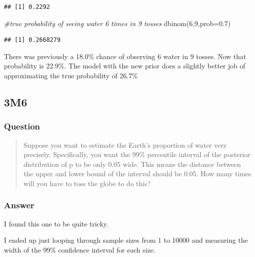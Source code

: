 \documentclass[
]{book}
\newenvironment{Shaded}{\begin{snugshade}}{\end{snugshade}}
\newcommand{\AttributeTok}[1]{\textcolor[rgb]{0.77,0.63,0.00}{#1}}
\newcommand{\CommentTok}[1]{\textcolor[rgb]{0.56,0.35,0.01}{\textit{#1}}}
\newcommand{\DecValTok}[1]{\textcolor[rgb]{0.00,0.00,0.81}{#1}}
\newcommand{\FloatTok}[1]{\textcolor[rgb]{0.00,0.00,0.81}{#1}}
\newcommand{\FunctionTok}[1]{\textcolor[rgb]{0.00,0.00,0.00}{#1}}
\newcommand{\NormalTok}[1]{#1}
\begin{document}
\begin{verbatim}
## [1] 0.2292
\end{verbatim}

\begin{Shaded}
\begin{Highlighting}[]
\CommentTok{\#true probability of seeing water 6 times in 9 tosses}
\FunctionTok{dbinom}\NormalTok{(}\DecValTok{6}\NormalTok{,}\DecValTok{9}\NormalTok{,}\AttributeTok{prob=}\FloatTok{0.7}\NormalTok{)}
\end{Highlighting}
\end{Shaded}

\begin{verbatim}
## [1] 0.2668279
\end{verbatim}

There was previously a 18.0\% chance of observing 6 water in 9 tosses. Now that probability is 22.9\%. The model with the new prior does a slightly better job of approximating the true probability of 26.7\%

\hypertarget{m6-1}{%
\subsection*{3M6}\label{m6-1}}

\hypertarget{question-27}{%
\subsubsection*{Question}\label{question-27}}

\begin{quote}
Suppose you want to estimate the Earth's proportion of water very precisely. Specifically, you want the 99\% percentile interval of the posterior distribution of p to be only 0.05 wide. This means the distance between the upper and lower bound of the interval should be 0.05. How many times will you have to toss the globe to do this?
\end{quote}

\hypertarget{answer-27}{%
\subsubsection*{Answer}\label{answer-27}}

I found this one to be quite tricky.

I ended up just looping through sample sizes from 1 to 10000 and measuring the width of the 99\% confidence interval for each size.
\end{document}
